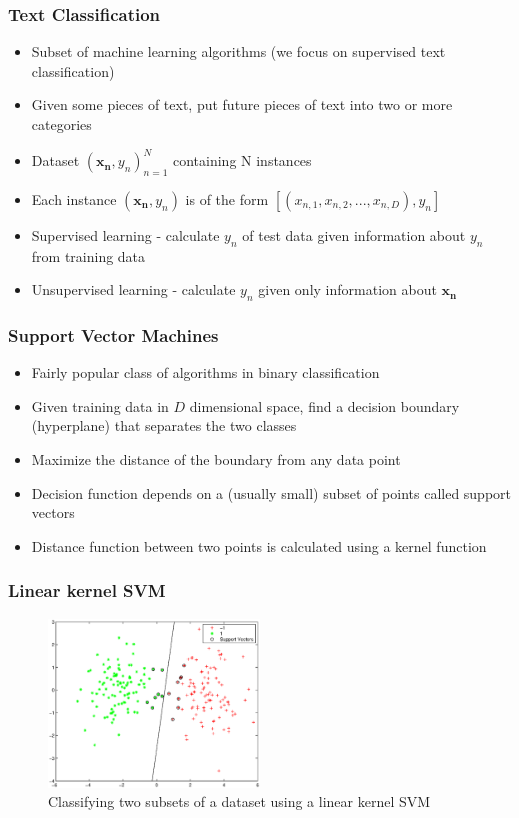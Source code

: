 \documentclass[9pt]{beamer}
\begin{document}
    \begin{frame}
        \frametitle{Text Classification}
        \begin{itemize}
            \item{Subset of machine learning algorithms (we focus on supervised text classification)}
            \item{Given some pieces of text, put future pieces of text into two or more categories}
            \item{Dataset ${(\mathbf{x_n}, y_n)}_{n = 1}^{N}$ containing N instances}
            \item{Each instance $(\mathbf{x_n}, y_n)$ is of the form $[(x_{n, 1}, x_{n, 2}, ..., x_{n, D}), y_n]$}
            \item{Supervised learning - calculate $y_n$ of test data given information about $y_n$ from training data}
            \item{Unsupervised learning - calculate $y_n$ given only information about $\mathbf{x_n}$}
        \end{itemize}
    \end{frame}
    
    \begin{frame}
        \frametitle{Support Vector Machines}
        \begin{itemize}
            \item{Fairly popular class of algorithms in binary classification}
            \item{Given training data in $D$ dimensional space, find a decision boundary (hyperplane) that separates the two classes}
            \item{Maximize the distance of the boundary from any data point}
            \item{Decision function depends on a (usually small) subset of points called support vectors}
            \item{Distance function between two points is calculated using a kernel function}
        \end{itemize}
    \end{frame}
    
    \begin{frame}
        \frametitle{Linear kernel SVM}
        \begin{figure}
            \centering
            \includegraphics[width=0.5\textwidth]{figures/svm_linear_classification.eps}
            \caption{Classifying two subsets of a dataset using a linear kernel SVM}
        \end{figure}
    \end{frame}
    
\end{document}
